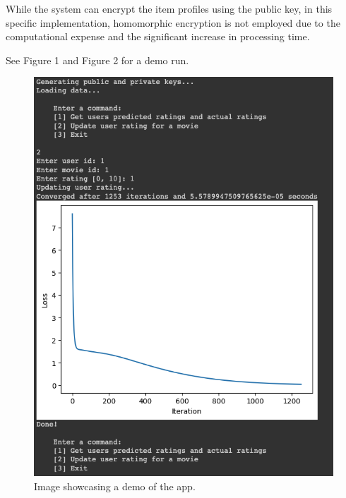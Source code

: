 \documentclass{article}
\begin{document}
While the system can encrypt the item profiles using the public key, in this specific implementation, homomorphic encryption is not employed due to the computational expense and the significant increase in processing time.

See Figure 1 and Figure 2 for a demo run.

\begin{figure}[h]
  \centering
  \includegraphics[width=\textwidth]{demo1.png}
  \caption{Image showcasing a demo of the app.}
  \label{fig:image}
\end{figure}
\end{document}
